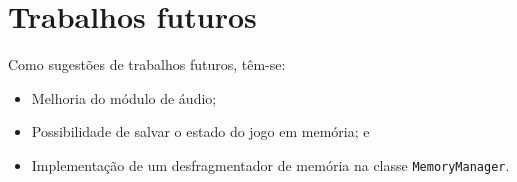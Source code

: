 \chapter[Trabalhos futuros]{Trabalhos futuros}

Como sugestões de trabalhos futuros, têm-se:

\begin{itemize}
  \item Melhoria do módulo de áudio;
  \item Possibilidade de salvar o estado do jogo em memória; e
  \item Implementação de um desfragmentador de memória na classe \texttt{MemoryManager}.
\end{itemize}